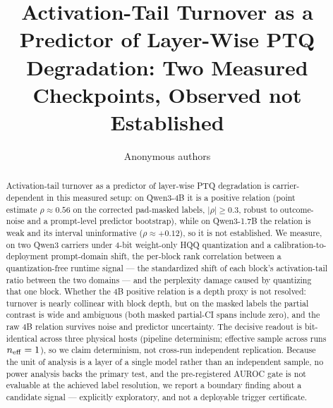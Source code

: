 \documentclass{article}
\title{Activation-Tail Turnover as a Predictor of Layer-Wise PTQ Degradation: Two Measured Checkpoints, Observed not Established}
\author{Anonymous authors}
\begin{document}
\maketitle

\begin{abstract}
Activation-tail turnover as a predictor of layer-wise PTQ degradation is carrier-dependent
in this measured setup: on Qwen3-4B it is a positive relation (point estimate
$\rho\approx 0.56$ on the corrected pad-masked labels, $|\rho|\ge 0.3$, robust to outcome-noise
and a prompt-level predictor bootstrap), while on Qwen3-1.7B the relation is weak and its
interval uninformative ($\rho\approx +0.12$), so it is not established. We measure, on two Qwen3
carriers under 4-bit weight-only HQQ quantization and a calibration-to-deployment prompt-domain
shift, the per-block rank correlation between a quantization-free runtime signal --- the
standardized shift of each block's activation-tail ratio between the two domains --- and the
perplexity damage caused by quantizing that one block. Whether the 4B positive relation is a
depth proxy is not resolved: turnover is nearly collinear with block depth, but on the masked
labels the partial contrast is wide and ambiguous (both masked partial-CI spans include zero),
and the raw 4B relation survives noise and predictor uncertainty. The decisive readout is
bit-identical across three physical hosts (pipeline determinism; effective sample across runs
$n_{\rm eff}=1$), so we claim determinism, not cross-run independent replication. Because the
unit of analysis is a layer of a single model rather than an independent sample, no power
analysis backs the primary test, and the pre-registered AUROC gate is not evaluable at the
achieved label resolution, we report a boundary finding about a candidate signal --- explicitly
exploratory, and not a deployable trigger certificate.
\end{abstract}
\end{document}
